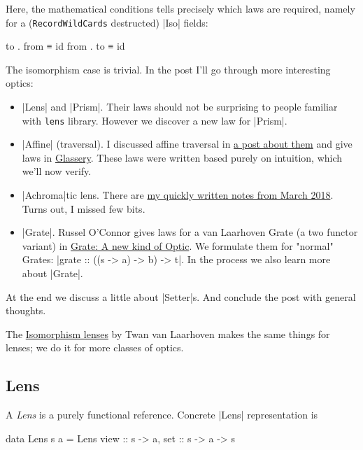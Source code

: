\documentclass{article}
\begin{document}
Here, the mathematical conditions tells precisely which laws are required,
namely for a (\texttt{RecordWildCards} destructed) |Iso| fields:

\begin{code}
to . from ≡ id
from . to ≡ id
\end{code}

The isomorphism case is trivial. In the post I'll go through more interesting
optics:

\begin{itemize}
\item |Lens| and |Prism|. Their laws should not be surprising to people
    familiar with \texttt{lens} library.
    However we discover a new law for |Prism|.

\item |Affine| (traversal). I discussed affine traversal in
\href{2017-03-20-affine-traversal.html}{a post about them}
and give laws in
\href{2017-04-18-glassery.html#laws:affine-traversal}{Glassery}.
These laws were written based purely on intuition, which we'll now verify.

\item |Achroma|tic lens. There are
  \href{2018-03-28-achromatic-lens.html}{my quickly written notes from March 2018}.
  Turns out, I missed few bits.

\item |Grate|. Russel O'Connor gives laws for a van Laarhoven Grate (a two functor variant) in
\href{https://r6research.livejournal.com/28050.html}{Grate: A new kind of Optic}.
We formulate them for "normal" Grates: |grate :: ((s -> a) -> b) -> t|.
In the process we also learn more about |Grate|.
\end{itemize}

At the end we discuss a little about |Setter|s. And conclude the post
with general thoughts.

The \href{https://twanvl.nl/blog/haskell/isomorphism-lenses}{Isomorphism lenses} by Twan van Laarhoven
makes the same things for lenses; we do it for more classes of optics.


\subsection{Lens}

A \emph{Lens} is a purely functional reference. Concrete |Lens| representation
is

\begin{code}
data Lens s a = Lens { view :: s -> a, set :: s -> a -> s }
\end{code}
\end{document}
